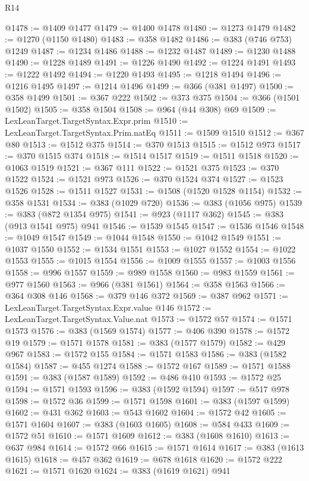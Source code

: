 \begin{lexlean}{R14}
\begin{coremodule}
@1478 := @1409 @1477
@1479 := @1400 @1478
@1480 := @1273 @1479
@1482 := @1270 (@1150 @1480)
@1483 := @358 @1482
@1486 := @383 (@746 @753) @1249
@1487 := @1234 @1486
@1488 := @1232 @1487
@1489 := @1230 @1488
@1490 := @1228 @1489
@1491 := @1226 @1490
@1492 := @1224 @1491
@1493 := @1222 @1492
@1494 := @1220 @1493
@1495 := @1218 @1494
@1496 := @1216 @1495
@1497 := @1214 @1496
@1499 := @366 (@381 @1497)
@1500 := @358 @1499
@1501 := @367 @222
@1502 := @373 @375
@1504 := @366 (@1501 @1502)
@1505 := @358 @1504
@1508 := @964 (@44 @308) @69
@1509 := LexLeanTarget.TargetSyntax.Expr.prim
@1510 := LexLeanTarget.TargetSyntax.Prim.natEq
@1511 := @1509 @1510
@1512 := @367 @80
@1513 := @1512 @375
@1514 := @370 @1513
@1515 := @1512 @973
@1517 := @370 @1515 @374
@1518 := @1514 @1517
@1519 := @1511 @1518
@1520 := @1063 @1519
@1521 := @367 @111
@1522 := @1521 @375
@1523 := @370 @1522
@1524 := @1521 @973
@1526 := @370 @1524 @374
@1527 := @1523 @1526
@1528 := @1511 @1527
@1531 := @1508 (@1520 @1528 @1154)
@1532 := @358 @1531
@1534 := @383 (@1029 @720)
@1536 := @383 (@1056 @975)
@1539 := @383 (@872 @1354 @975)
@1541 := @923 (@1117 @362)
@1545 := @383 (@913 @1541 @975) @941
@1546 := @1539 @1545
@1547 := @1536 @1546
@1548 := @1049 @1547
@1549 := @1044 @1548
@1550 := @1042 @1549
@1551 := @1037 @1550
@1552 := @1534 @1551
@1553 := @1027 @1552
@1554 := @1022 @1553
@1555 := @1015 @1554
@1556 := @1009 @1555
@1557 := @1003 @1556
@1558 := @996 @1557
@1559 := @989 @1558
@1560 := @983 @1559
@1561 := @977 @1560
@1563 := @966 (@381 @1561)
@1564 := @358 @1563
@1566 := @364 @308 @146
@1568 := @379 @146 @372
@1569 := @387 @962
@1571 := LexLeanTarget.TargetSyntax.Expr.value @146
@1572 := LexLeanTarget.TargetSyntax.Value.nat
@1573 := @1572 @57
@1574 := @1571 @1573
@1576 := @383 (@1569 @1574)
@1577 := @406 @390
@1578 := @1572 @19
@1579 := @1571 @1578
@1581 := @383 (@1577 @1579)
@1582 := @429 @967
@1583 := @1572 @155
@1584 := @1571 @1583
@1586 := @383 (@1582 @1584)
@1587 := @455 @1274
@1588 := @1572 @167
@1589 := @1571 @1588
@1591 := @383 (@1587 @1589)
@1592 := @486 @410
@1593 := @1572 @25
@1594 := @1571 @1593
@1596 := @383 (@1592 @1594)
@1597 := @517 @978
@1598 := @1572 @36
@1599 := @1571 @1598
@1601 := @383 (@1597 @1599)
@1602 := @431 @362
@1603 := @543 @1602
@1604 := @1572 @42
@1605 := @1571 @1604
@1607 := @383 (@1603 @1605)
@1608 := @584 @433
@1609 := @1572 @51
@1610 := @1571 @1609
@1612 := @383 (@1608 @1610)
@1613 := @637 @984
@1614 := @1572 @66
@1615 := @1571 @1614
@1617 := @383 (@1613 @1615)
@1618 := @457 @362
@1619 := @678 @1618
@1620 := @1572 @222
@1621 := @1571 @1620
@1624 := @383 (@1619 @1621) @941

\end{coremodule}
\end{lexlean}

